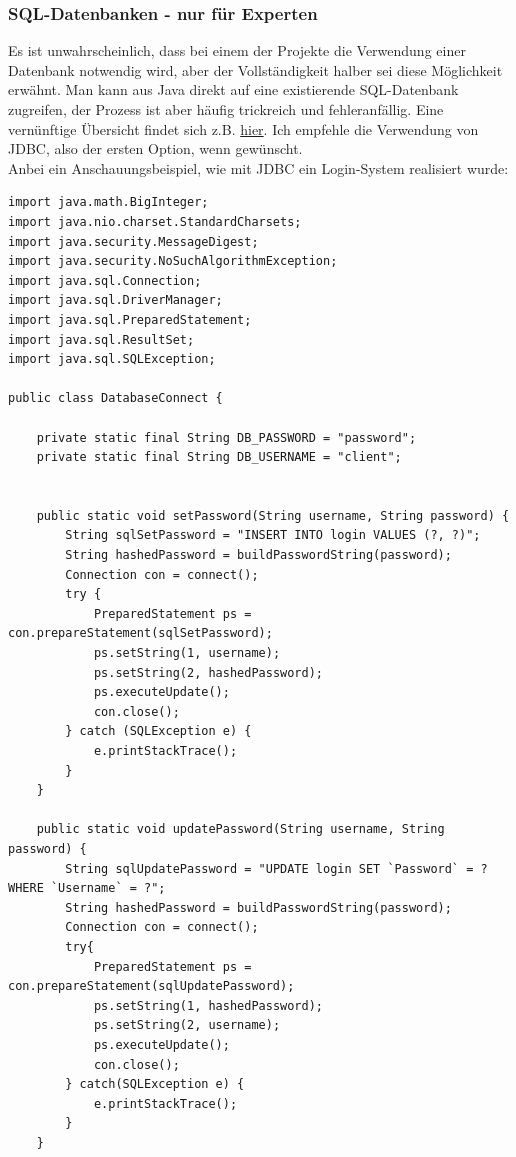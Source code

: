 \documentclass{article}
\begin{document}
\subsubsection{SQL-Datenbanken - nur für Experten}

Es ist unwahrscheinlich, dass bei einem der Projekte die Verwendung einer Datenbank notwendig wird, aber der Vollständigkeit halber sei diese Möglichkeit erwähnt. Man kann aus Java direkt auf eine existierende SQL-Datenbank zugreifen, der Prozess ist aber häufig trickreich und fehleranfällig. Eine vernünftige Übersicht findet sich z.B. \href{https://www.baeldung.com/java-connect-mysql}{hier}. Ich empfehle die Verwendung von JDBC, also der ersten Option, wenn gewünscht. \\
Anbei ein Anschauungsbeispiel, wie mit JDBC ein Login-System realisiert wurde: 
\begin{verbatim}
import java.math.BigInteger;
import java.nio.charset.StandardCharsets;
import java.security.MessageDigest;
import java.security.NoSuchAlgorithmException;
import java.sql.Connection;
import java.sql.DriverManager;
import java.sql.PreparedStatement;
import java.sql.ResultSet;
import java.sql.SQLException;

public class DatabaseConnect {
    
    private static final String DB_PASSWORD = "password";
    private static final String DB_USERNAME = "client";


    public static void setPassword(String username, String password) {
        String sqlSetPassword = "INSERT INTO login VALUES (?, ?)";
        String hashedPassword = buildPasswordString(password);
        Connection con = connect();
        try {
            PreparedStatement ps = con.prepareStatement(sqlSetPassword);
            ps.setString(1, username);
            ps.setString(2, hashedPassword);
            ps.executeUpdate();
            con.close();
        } catch (SQLException e) {
            e.printStackTrace();
        }
    }

    public static void updatePassword(String username, String password) {
        String sqlUpdatePassword = "UPDATE login SET `Password` = ?  WHERE `Username` = ?";
        String hashedPassword = buildPasswordString(password);
        Connection con = connect();
        try{
            PreparedStatement ps = con.prepareStatement(sqlUpdatePassword);
            ps.setString(1, hashedPassword);
            ps.setString(2, username);
            ps.executeUpdate();
            con.close();
        } catch(SQLException e) {
            e.printStackTrace();
        }
    }


\end{verbatim}
\end{document}
